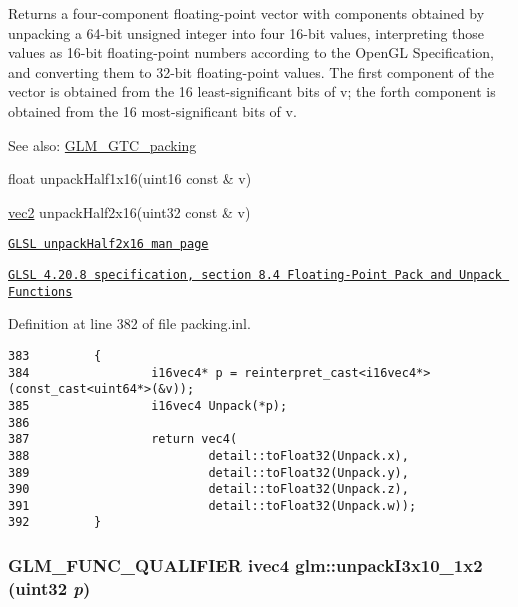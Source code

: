 Returns a four-component floating-point vector with components obtained by unpacking a 64-bit unsigned integer into four 16-bit values, interpreting those values as 16-bit floating-point numbers according to the OpenGL Specification, and converting them to 32-bit floating-point values. The first component of the vector is obtained from the 16 least-significant bits of v; the forth component is obtained from the 16 most-significant bits of v.

\begin{Desc}
\item[See also:]\hyperlink{group__gtc__packing}{GLM\_\-GTC\_\-packing} 

float unpackHalf1x16(uint16 const \& v) 

\hyperlink{group__core__types_ga1618f51db67eaa145db101d8c8431d8}{vec2} unpackHalf2x16(uint32 const \& v) 

\href{http://www.opengl.org/sdk/docs/manglsl/xhtml/unpackHalf2x16.xml}{\tt GLSL unpackHalf2x16 man page} 

\href{http://www.opengl.org/registry/doc/GLSLangSpec.4.20.8.pdf}{\tt GLSL 4.20.8 specification, section 8.4 Floating-Point Pack and Unpack Functions} \end{Desc}


Definition at line 382 of file packing.inl.

\begin{Code}\begin{verbatim}383         {
384                 i16vec4* p = reinterpret_cast<i16vec4*>(const_cast<uint64*>(&v));
385                 i16vec4 Unpack(*p);
386         
387                 return vec4(
388                         detail::toFloat32(Unpack.x), 
389                         detail::toFloat32(Unpack.y), 
390                         detail::toFloat32(Unpack.z), 
391                         detail::toFloat32(Unpack.w));
392         }
\end{verbatim}
\end{Code}


\hypertarget{group__gtc__packing_g08bcd34cf9c34701d658dd861ee6e300}{
\subsubsection[unpackI3x10\_\-1x2]{\setlength{\rightskip}{0pt plus 5cm}GLM\_\-FUNC\_\-QUALIFIER ivec4 glm::unpackI3x10\_\-1x2 (uint32 {\em p})}}
\label{group__gtc__packing_g08bcd34cf9c34701d658dd861ee6e300}


